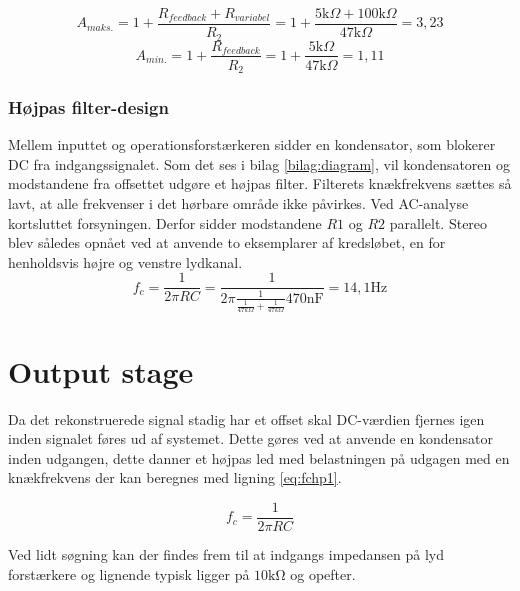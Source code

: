 \begin{equation}
\label{eq:Aminfors}
A_{maks.} = 1 + \frac{R_{feedback} + R_{variabel}}{R_2} = 1 + \frac{5\text{k} \Omega + 100\text{k} \Omega}{47\text{k} \Omega} = 3,23
\end{equation}
\begin{equation}
\label{Amaksfors}
A_{min.} = 1 + \frac{R_{feedback}}{R_2} = 1 + \frac{5\text{k} \Omega}{47\text{k} \Omega} = 1,11
\end{equation}

\subsubsection{Højpas filter-design}
Mellem inputtet og operationsforstærkeren sidder en kondensator, som blokerer DC fra indgangssignalet. 
Som det ses i bilag \ref{bilag:diagram}, vil kondensatoren og modstandene fra offsettet udgøre et højpas filter. 
Filterets knækfrekvens sættes så lavt, at alle frekvenser i det hørbare område ikke påvirkes. 
Ved AC-analyse kortsluttet forsyningen. Derfor sidder modstandene $R1$ og $R2$ parallelt.
Stereo blev således opnået ved at anvende to eksemplarer af kredsløbet, en for henholdsvis højre og venstre lydkanal.
\begin{equation}
f_c = \frac{1}{2\pi R C} = \frac{1}{2 \pi \frac{1}{\frac{1}{47k \Omega}+\frac{1}{47k \Omega}}  470\text{nF}} = 14,1\text{Hz}
\end{equation}

\section{Output stage}

Da det rekonstruerede signal stadig har et offset skal DC-værdien fjernes igen inden signalet føres ud af systemet.
Dette gøres ved at anvende en kondensator inden udgangen, dette danner et højpas led med belastningen på udgagen med en knækfrekvens der kan beregnes med ligning \ref{eq:fchp1}.

\begin{equation}
	f_c = \frac{1}{2\pi RC}
\label{eq:fchp1}
\end{equation}

Ved lidt søgning kan der findes frem til at indgangs impedansen på lyd forstærkere og lignende typisk ligger på $10\si{\kilo\ohm}$ og opefter.

